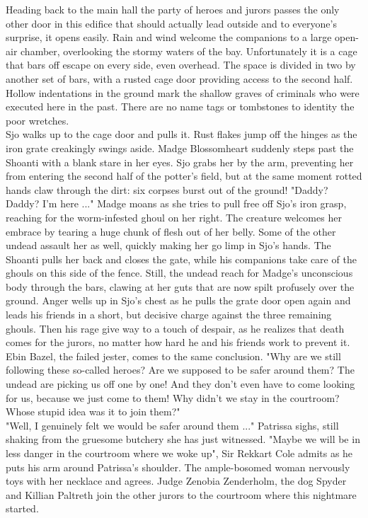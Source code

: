 Heading back to the main hall the party of heroes and jurors passes the only other door in this edifice that should actually lead outside and to everyone's surprise, it opens easily. Rain and wind welcome the companions to a large open-air chamber, overlooking the stormy waters of the bay. Unfortunately it is a cage that bars off escape on every side, even overhead. The space is divided in two by another set of bars, with a rusted cage door providing access to the second half. Hollow indentations in the ground mark the shallow graves of criminals who were executed here in the past. There are no name tags or tombstones to identity the poor wretches.\\

Sjo walks up to the cage door and pulls it. Rust flakes jump off the hinges as the iron grate creakingly swings aside. Madge Blossomheart suddenly steps past the Shoanti with a blank stare in her eyes. Sjo grabs her by the arm, preventing her from entering the second half of the potter's field, but at the same moment rotted hands claw through the dirt: six corpses burst out of the ground! "Daddy? Daddy? I'm here ..." Madge moans as she tries to pull free off Sjo's iron grasp, reaching for the worm-infested ghoul on her right. The creature welcomes her embrace by tearing a huge chunk of flesh out of her belly. Some of the other undead assault her as well, quickly making her go limp in Sjo's hands. The Shoanti pulls her back and closes the gate, while his companions take care of the ghouls on this side of the fence. Still, the undead reach for Madge's unconscious body through the bars, clawing at her guts that are now spilt profusely over the ground. Anger wells up in Sjo's chest as he pulls the grate door open again and leads his friends in a short, but decisive charge against the three remaining ghouls. Then his rage give way to a touch of despair, as he realizes that death comes for the jurors, no matter how hard he and his friends work to prevent it.\\

Ebin Bazel, the failed jester, comes to the same conclusion. "Why are we still following these so-called heroes? Are we supposed to be safer around them? The undead are picking us off one by one! And they don't even have to come looking for us, because we just come to them! Why didn't we stay in the courtroom? Whose stupid idea was it to join them?"\\

"Well, I genuinely felt we would be safer around them ..." Patrissa sighs, still shaking from the gruesome butchery she has just witnessed. "Maybe we will be in less danger  in the courtroom where we woke up", Sir Rekkart Cole admits as he puts his arm around Patrissa's shoulder. The ample-bosomed woman nervously toys with her necklace and agrees. Judge Zenobia Zenderholm, the dog Spyder and Killian Paltreth join the other jurors to the courtroom where this nightmare started.\\

